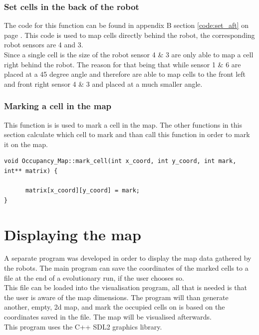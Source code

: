 \subsubsection{Set cells in the back of the robot}
The code for this function can be found in appendix B section \ref{code:set_aft} on page \pageref{code:set_aft}. 
This code is used to map cells directly behind the robot, the corresponding robot sensors are 4 and 3. \\
Since a single cell is the size of the robot sensor 4 \& 3 are only able to map a cell right behind the robot. The reason for that being that while sensor 1 \& 6 are placed at a 45 degree angle and therefore are able to map cells to the front left and front right sensor 4 \& 3 and placed at a much smaller angle. 

\subsubsection{Marking a cell in the map}
This function is is used to mark a cell in the map. The other functions in this section calculate which cell to mark and than call this function in order to mark it on the map.

\begin{lstlisting}[caption = {Mark a cell on the map}]
void Occupancy_Map::mark_cell(int x_coord, int y_coord, int mark, int** matrix) {

      matrix[x_coord][y_coord] = mark;
}
\end{lstlisting}

\section{Displaying the map}
A separate program was developed in order to display the map data gathered by the robots. The main program can save the coordinates of the marked cells to a file at the end of a evolutionary run, if the user chooses so. \\
This file can be loaded into the visualisation program, all that is needed is that the user is aware of the map dimensions. 
The program will than generate another, empty, 2d map, and mark the occupied cells on is based on the coordinates saved in the file. 
The map will be visualised afterwards.\\
This program uses the C++ SDL2 graphics library. 



